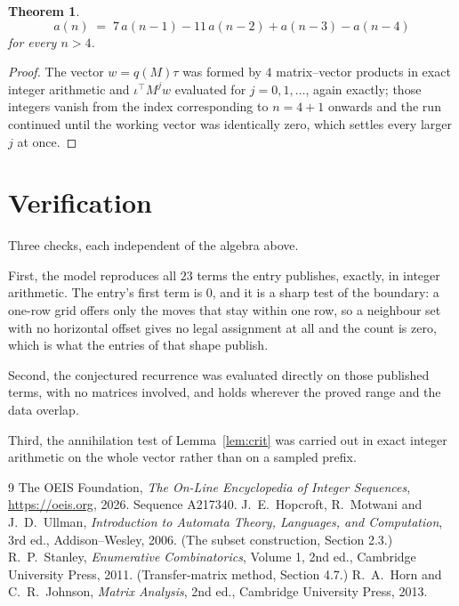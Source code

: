 \documentclass[11pt,a4paper]{article}
\theoremstyle{plain}
\newtheorem{theorem}{Theorem}
\theoremstyle{definition}
\begin{document}
\begin{theorem}
\[
a(n)\;=\;7\,a(n-1) - 11\,a(n-2) + a(n-3) - a(n-4)
\]
for every $n>4$.
\end{theorem}

\begin{proof}
The vector $w=q(M)\tau$ was formed by $4$ matrix--vector products in exact integer
arithmetic and $\iota^{\!\top}M^{j}w$ evaluated for $j=0,1,\dots$, again exactly; those
integers vanish from the index corresponding to $n=4+1$ onwards and the run continued
until the working vector was identically zero, which settles every larger $j$ at once.
\end{proof}

\section{Verification}

Three checks, each independent of the algebra above.

First, the model reproduces all $23$ terms the entry publishes, exactly, in integer
arithmetic. The entry's first term is $0$, and it is a sharp test of the boundary: a
one-row grid offers only the moves that stay within one row, so a neighbour set with no
horizontal offset gives no legal assignment at all and the count is zero, which is what the
entries of that shape publish.

Second, the conjectured recurrence was evaluated directly on those published terms, with no
matrices involved, and holds wherever the proved range and the data overlap.

Third, the annihilation test of Lemma~\ref{lem:crit} was carried out in exact integer
arithmetic on the whole vector rather than on a sampled prefix.

\begin{thebibliography}{9}
 The OEIS Foundation, \emph{The On-Line Encyclopedia of Integer
Sequences}, \url{https://oeis.org}, 2026. Sequence A217340.
 J.~E.~Hopcroft, R.~Motwani and J.~D.~Ullman, \emph{Introduction to Automata
Theory, Languages, and Computation}, 3rd ed., Addison--Wesley, 2006. (The subset
construction, Section 2.3.)
 R.~P.~Stanley, \emph{Enumerative Combinatorics}, Volume 1, 2nd ed.,
Cambridge University Press, 2011. (Transfer-matrix method, Section 4.7.)
 R.~A.~Horn and C.~R.~Johnson, \emph{Matrix Analysis}, 2nd ed., Cambridge
University Press, 2013.
\end{thebibliography}
\end{document}
